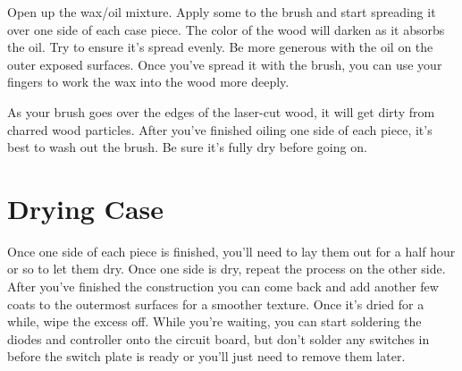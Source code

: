 \documentclass{article}
\begin{document}
Open up the wax/oil mixture. Apply some to the brush and start
spreading it over one side of each case piece. The color of the wood
will darken as it absorbs the oil. Try to ensure it's spread
evenly. Be more generous with the oil on the outer exposed
surfaces. Once you've spread it with the brush, you can use your
fingers to work the wax into the wood more deeply.

\vspace{1em}
\noindent{}
\vspace{1em}

As your brush goes over the edges of the laser-cut wood, it will get
dirty from charred wood particles. After you've finished oiling one
side of each piece, it's best to wash out the brush. Be sure it's
fully dry before going on.

\section{Drying Case}

Once one side of each piece is finished, you'll need to lay them out
for a half hour or so to let them dry. Once one side is dry, repeat
the process on the other side. After you've finished the construction
you can come back and add another few coats to the outermost surfaces
for a smoother texture. Once it's dried for a while, wipe the excess
off. While you're waiting, you can start soldering the diodes and
controller onto the circuit board, but don't solder any switches in
before the switch plate is ready or you'll just need to remove them
later.
\end{document}
